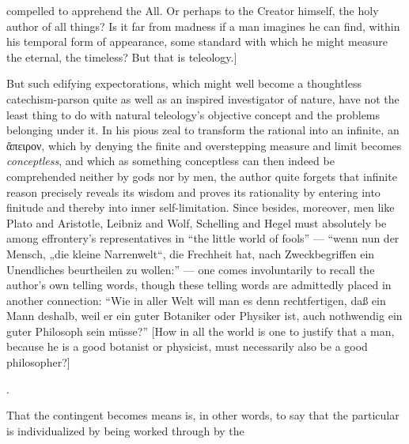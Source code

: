 \documentclass[12pt,a4paper]{book}
\begin{document}
{compelled to apprehend the All. Or perhaps to the Creator himself, the holy
author of all things? Is it far from madness if a man imagines he can find,
within his temporal form of appearance, some standard with which he might measure
the eternal, the timeless? But that is teleology.]
\par But such edifying expectorations, which might well become a thoughtless
catechism-parson quite as well as an inspired investigator of nature, have not
the least thing to do with natural teleology's objective concept and the problems
belonging under it. In his pious zeal to transform the rational into an infinite,
an ἄπειρον, which by denying the finite and overstepping measure and limit
becomes \emph{conceptless}, and which as something conceptless can then indeed be
comprehended neither by gods nor by men, the author quite forgets that infinite
reason precisely reveals its wisdom and proves its rationality by entering into
finitude and thereby into inner self-limitation. Since besides, moreover, men
like Plato and Aristotle, Leibniz and Wolf, Schelling and Hegel must absolutely
be among effrontery's representatives in ``the little world of fools'' --- ``wenn
nun der Mensch, „die kleine Narrenwelt“, die Frechheit hat, nach Zweckbegriffen
ein Unendliches beurtheilen zu wollen:'' --- one comes involuntarily to recall
the author's own telling words, though these telling words are admittedly placed
in another connection: ``Wie in aller Welt will man es denn rechtfertigen, daß
ein Mann deshalb, weil er ein guter Botaniker oder Physiker ist, auch nothwendig
ein guter Philosoph sein müsse?'' [How in all the world is one to justify that a
man, because he is a good botanist or physicist, must necessarily also be a good
philosopher?]}.

That the contingent becomes means is, in other words, to say that the particular
is individualized by being worked through by the
\end{document}
